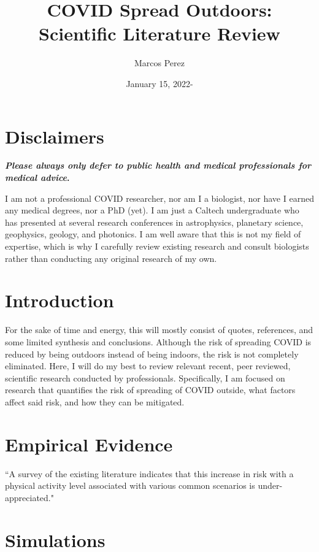 \documentclass[12pt]{article}
\title{\vspace{-2cm}COVID Spread Outdoors: Scientific Literature Review}
\author{Marcos Perez}
\date{January 15, 2022-}
\begin{document}
\maketitle

\section{Disclaimers}
\textbf{\textit{Please always only defer to public health and medical professionals for medical advice}. }\par
 I am not a professional COVID researcher, nor am I a biologist, nor have I earned any medical degrees, nor a PhD (yet). I am just a Caltech undergraduate who has presented at several research conferences in astrophysics, planetary science, geophysics, geology, and photonics. I am well aware that this is not my field of expertise, which is why I carefully review existing research and consult biologists rather than conducting any original research of my own.\\
\section{Introduction}
For the sake of time and energy, this will mostly consist of quotes, references, and some limited synthesis and conclusions. Although the risk of spreading COVID is reduced by being outdoors instead of being indoors, the risk is not completely eliminated. Here, I will do my best to review relevant recent, peer reviewed, scientific research conducted by professionals. Specifically, I am focused on research that quantifies the risk of spreading of COVID outside, what factors affect said risk, and how they can be mitigated. 
\section{Empirical Evidence}
“A survey of the existing literature indicates that this
increase in risk with a physical activity level associated with various
common scenarios is under-appreciated."\cite{noauthor_mathematical_nodate}
\section{Simulations}
\end{document}
